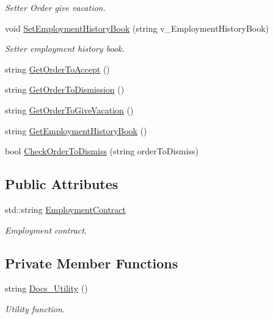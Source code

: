 \begin{DoxyCompactItemize}
\begin{DoxyCompactList}\small\item\em Setter Order give vacation. \end{DoxyCompactList}\item 
void \hyperlink{class_documents_a49f95590b3808cdada6632f702213bfa}{Set\+Employment\+History\+Book} (string v\+\_\+\+Employment\+History\+Book)
\begin{DoxyCompactList}\small\item\em Setter employment history book. \end{DoxyCompactList}\item 
string \hyperlink{class_documents_aac5573ba9b558530c669eccf178e3879}{Get\+Order\+To\+Accept} ()
\item 
string \hyperlink{class_documents_a47d56daa1f7434c712707bec1c827ea2}{Get\+Order\+To\+Dismission} ()
\item 
string \hyperlink{class_documents_ab13dc4fd233d75d6be5a39142ad99b13}{Get\+Order\+To\+Give\+Vacation} ()
\item 
string \hyperlink{class_documents_a44b0e6798731de568258ff317c6700da}{Get\+Employment\+History\+Book} ()
\item 
bool \hyperlink{class_documents_a97d69eea71291c43d6c344c4efeb8fc6}{Check\+Order\+To\+Dismiss} (string order\+To\+Dismiss)
\end{DoxyCompactItemize}
\subsection*{Public Attributes}
\begin{DoxyCompactItemize}
\item 
std\+::string \hyperlink{class_documents_a28e850b0505533696603105c57450770}{Employment\+Contract}
\begin{DoxyCompactList}\small\item\em Employment contract. \end{DoxyCompactList}\end{DoxyCompactItemize}
\subsection*{Private Member Functions}
\begin{DoxyCompactItemize}
\item 
string \hyperlink{class_documents_a7f06bda36f9fe48a22a8c511aa1e2d06}{Docs\+\_\+\+Utility} ()
\begin{DoxyCompactList}\small\item\em Utility function. \end{DoxyCompactList}\end{DoxyCompactItemize}
